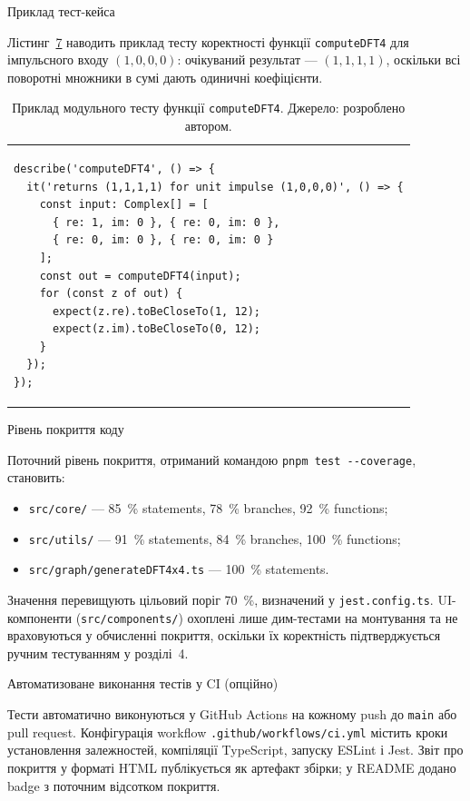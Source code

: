 Приклад тест-кейса

Лістинг~\hyperref[lst:test_example]{7} наводить приклад тесту
коректності функції \texttt{computeDFT4} для імпульсного входу
\((1,0,0,0)\): очікуваний результат --- \((1,1,1,1)\), оскільки всі
поворотні множники в сумі дають одиничні коефіцієнти.

\begin{longtable}[]{@{}
  >{\raggedright\arraybackslash}p{}@{}}
\caption{Приклад модульного тесту функції \protect\texttt{computeDFT4}.
Джерело: розроблено автором.}\tabularnewline
\toprule\noalign{}
\endfirsthead
\endhead
\bottomrule\noalign{}
\endlastfoot
\begin{minipage}[t]{\linewidth}\raggedright
\begin{verbatim}
describe('computeDFT4', () => {
  it('returns (1,1,1,1) for unit impulse (1,0,0,0)', () => {
    const input: Complex[] = [
      { re: 1, im: 0 }, { re: 0, im: 0 },
      { re: 0, im: 0 }, { re: 0, im: 0 }
    ];
    const out = computeDFT4(input);
    for (const z of out) {
      expect(z.re).toBeCloseTo(1, 12);
      expect(z.im).toBeCloseTo(0, 12);
    }
  });
});
\end{verbatim}
\end{minipage} \\
\end{longtable}

Рівень покриття коду

Поточний рівень покриття, отриманий командою
\texttt{pnpm\ test\ -\/-coverage}, становить:

\begin{itemize}
\item
  \texttt{src/core/} --- 85~\% statements, 78~\% branches, 92~\%
  functions;
\item
  \texttt{src/utils/} --- 91~\% statements, 84~\% branches, 100~\%
  functions;
\item
  \texttt{src/graph/generateDFT4x4.ts} --- 100~\% statements.
\end{itemize}

Значення перевищують цільовий поріг 70~\%, визначений у
\texttt{jest.config.ts}. UI-компоненти (\texttt{src/components/})
охоплені лише дим-тестами на монтування та не враховуються у обчисленні
покриття, оскільки їх коректність підтверджується ручним тестуванням у
розділі~4.

Автоматизоване виконання тестів у CI (опційно)

Тести автоматично виконуються у GitHub Actions на кожному push до
\texttt{main} або pull request. Конфігурація workflow
\texttt{.github/workflows/ci.yml} містить кроки установлення
залежностей, компіляції TypeScript, запуску ESLint і Jest. Звіт про
покриття у форматі HTML публікується як артефакт збірки; у README додано
badge з поточним відсотком покриття.

